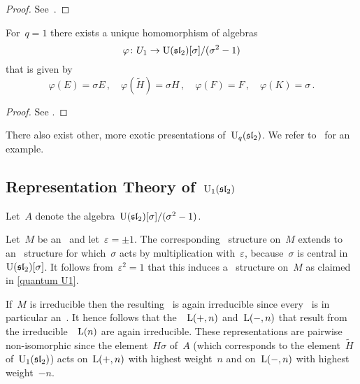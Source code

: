 \documentclass[a4paper, 11pt, oneside]{scrartcl}
\begin{document}
\begin{proof}
 See~{\cite[Proposition~VI.2.1]{kassel_quantum}}.
\end{proof}

\begin{proposition}
  For~$q = 1$ there exists a unique homomorphism of algebras
  \[
    \varphi
    \colon
    U_1
    \to
    \operatorname{U}(\mathfrak{sl}_2)[\sigma]/(\sigma^2 - 1)
  \]
  that is given by
  \[
    \varphi(E) = \sigma E \,,
    \quad
    \varphi(\widetilde{H}) = \sigma H \,,
    \quad
    \varphi(F) = F \,,
    \quad
    \varphi(K) = \sigma \,.
  \]
\end{proposition}

\begin{proof}
  See \cite[Proof of Proposition~VI.2.2]{kassel_quantum}.
\end{proof}

\begin{remark}
  There also exist other, more exotic presentations of~$\operatorname{U}_q(\mathfrak{sl}_2)$.
  We refer to~\cite{equitable_presentation} for an example.
\end{remark}




\subsection{Representation Theory of~$\operatorname{U}_1(\mathfrak{sl}_2)$}
\label{representation theory of U1}

Let~$A$ denote the algebra~$\operatorname{U}(\mathfrak{sl}_2)[\sigma]/(\sigma^2 - 1)$.

Let~$M$ be an~ and let~$\varepsilon = \pm 1$.
The corresponding~ structure on~$M$ extends to an~ structure for which~$\sigma$ acts by multiplication with~$\varepsilon$, because~$\sigma$ is central in~$\operatorname{U}(\mathfrak{sl}_2)[\sigma]$.
It follows from~$\varepsilon^2 = 1$ that this induces a~ structure on~$M$ as claimed in \cref{quantum U1}.

If~$M$ is irreducible then the resulting~ is again irreducible since every~ is in particular an~.
It hence follows that the~~$\operatorname{L}(+,n)$ and~$\operatorname{L}(-,n)$ that result from the irreducible~~$\operatorname{L}(n)$ are again irreducible.
These representations are pairwise non-isomorphic since the element~$H \sigma$ of~$A$ (which corresponds to the element~$\widetilde{H}$ of~$\operatorname{U}_1(\mathfrak{sl}_2)$) acts on~$\operatorname{L}(+,n)$ with highest weight~$n$ and on~$\operatorname{L}(-,n)$ with highest weight~$-n$.
\end{document}
